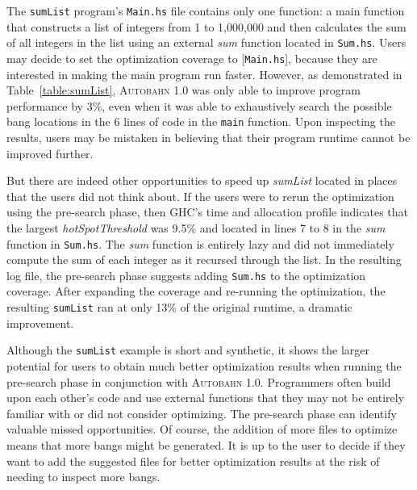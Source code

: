 \documentclass[format=sigplan, review=true]{acmart}
\newcommand{\tblref}[1]{Table~\ref{#1}}
\newcommand{\hotspotcost}[0]{\textit{hotSpotThreshold}}
\newcommand{\Ao}[0]{\textsc{Autobahn 1.0}}
\newcommand{\preopt}[0]{pre-search}
\begin{document}
The \texttt{sumList} program's \texttt{Main.hs} file contains only one
function: a main function that constructs a list of integers from 1 to
1,000,000 and then calculates the sum of all integers in the list using an
external \textit{sum} function located in \texttt{Sum.hs}. Users
may decide to set the optimization coverage to [\texttt{Main.hs}],
because they are interested in making the main program run
faster. However, as demonstrated in \tblref{table:sumList}, \Ao{} was only able to
improve program performance by 3\%, even when it was able to
exhaustively search the possible bang locations in the 6 lines of code in the \texttt{main}
function. Upon inspecting the results, users may be mistaken in
believing that their program runtime cannot be improved
further.

But there are indeed other opportunities to speed up \textit{sumList}
located in places that the users did not think about. If the users were
to rerun the optimization using the \preopt{} phase, then GHC's time and
allocation profile indicates that the largest \hotspotcost{} was 9.5\%
and located in lines 7 to 8 in the \textit{sum} function
in \texttt{Sum.hs}. The \textit{sum} function is entirely lazy and did
not immediately compute the sum of each integer as it recursed through
the list. In the resulting log file, the \preopt{} phase 
suggests 
adding \texttt{Sum.hs} to the optimization coverage.
After expanding the coverage and re-running the optimization,
the resulting \texttt{sumList} ran at only 13\% of the original
runtime, a dramatic improvement.

Although the \texttt{sumList} example is short and synthetic, it shows
the larger potential for users to obtain much better optimization
results when running the \preopt{} phase in conjunction
with \Ao{}. Programmers often build upon each other's code and use
external functions that they may not be entirely familiar with or did
not consider optimizing. The \preopt{} phase can identify valuable
missed opportunities. Of
course, the addition of more files to optimize means that more bangs
might be generated. It is up to the user to decide if they want to add
the suggested files for better optimization results at the risk of
needing to inspect more bangs.
\newline
\end{document}
